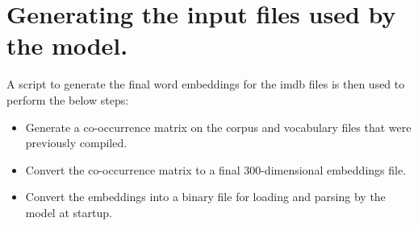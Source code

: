 \chapter{Generating the input files used by the model.}
\label{chp:appendix_a}

A script to generate the final word embeddings for the \gls{imdb} files is then used to perform the below steps:
\begin{itemize}
    \item Generate a co-occurrence matrix on the \gls{corpus} and vocabulary files that were previously compiled.
    \item Convert the co-occurrence matrix to a final 300-dimensional embeddings file.
    \item Convert the embeddings into a binary file for loading and parsing by the model at startup.
\end{itemize}